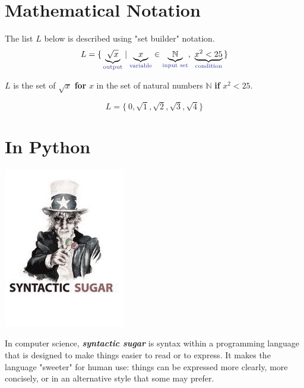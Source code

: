 \documentclass{tufte-handout}
\begin{document}
\normalsize


\section{Mathematical Notation }
The list $L$ below is described using "set builder" notation. 
$$L=\{\,\underbrace{\sqrt{x}}_{\color{Blue}{\text{output}}}\mid \underbrace{x}_{\color{Blue}{\text{variable}}} \in \underbrace{\mathbb{N}}_{\color{Blue}{\text{input set}}},\ \underbrace{x^2<25}_{\color{Blue}{\text{condition}}}\,\}$$

$L$ is the set of $\sqrt{x}$ \textbf{for} $x$ in the set of natural numbers $\mathbb{N}$ \textbf{if} $x^2<25$.

$$L=\{\ 0,\sqrt{1} ,\sqrt{2},\sqrt{3},\sqrt{4}\}$$

\section{In Python}

\marginnote[0pt]{
}

\begin{marginfigure}[0 pt]%
\center
  \includegraphics[width=0.63\linewidth]{sugar.jpg}
  \caption{In computer science, \textit{\textbf{syntactic sugar} } is syntax within a programming language that is designed to make things easier to read or to express. It makes the language "sweeter" for human use: things can be expressed more clearly, more concisely, or in an alternative style that some may prefer.}
  \label{fig:marginfig}
\end{marginfigure}
\end{document}
